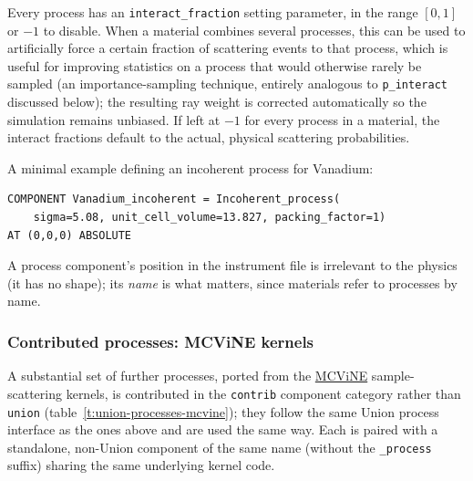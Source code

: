 Every process has an \texttt{interact\_fraction} setting parameter, in the
range $[0,1]$ or $-1$ to disable. When a material combines several
processes, this can be used to artificially force a certain fraction of
scattering events to that process, which is useful for improving statistics
on a process that would otherwise rarely be sampled (an importance-sampling
technique, entirely analogous to \texttt{p\_interact} discussed below); the
resulting ray weight is corrected automatically so the simulation remains
unbiased. If left at $-1$ for every process in a material, the interact
fractions default to the actual, physical scattering probabilities.

A minimal example defining an incoherent process for Vanadium:
\begin{lstlisting}
COMPONENT Vanadium_incoherent = Incoherent_process(
    sigma=5.08, unit_cell_volume=13.827, packing_factor=1)
AT (0,0,0) ABSOLUTE
\end{lstlisting}
A process component's position in the instrument file is irrelevant to the
physics (it has no shape); its \emph{name} is what matters, since materials
refer to processes by name.

\subsubsection*{Contributed processes: MCViNE kernels}

A substantial set of further processes, ported from the
\href{https://github.com/mcvine/mcvine}{MCViNE} sample-scattering kernels,
is contributed in the \texttt{contrib} component category rather than
\texttt{union} (table~\ref{t:union-processes-mcvine}); they follow the
same Union process interface as the ones above and are used the same way.
Each is paired with a standalone, non-Union component of the same name
(without the \texttt{\_process} suffix) sharing the same underlying
kernel code.

